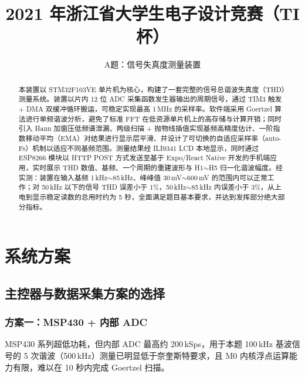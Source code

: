 \documentclass[a4paper]{article}
\title{\Huge2021 年浙江省大学生电子设计竞赛（TI 杯）}
\date{\LARGE A题：信号失真度测量装置}
\begin{document}
	\maketitle
	\vspace{10em}

	\begin{abstract}
		本装置以 STM32F103VE 单片机为核心，构建了一套完整的信号总谐波失真度（THD）测量系统。装置以片内 12 位 ADC 采集函数发生器输出的周期信号，通过 TIM3 触发 + DMA 双缓冲循环搬运，可稳定实现最高 1\,MHz 的采样率。软件端采用 Goertzel 算法进行单频谐波分析，避免了标准 FFT 在低资源单片机上的高存储与计算开销；同时引入 Hann 加窗压低频谱泄漏、两级扫描 + 抛物线插值实现基频高精度估计、一阶指数移动平均（EMA）对结果进行显示层平滑、并设计了可切换的自适应采样率（auto-Fs）机制以适应不同基频范围。测量结果经 ILI9341 LCD 本地显示，同时通过 ESP8266 模块以 HTTP POST 方式发送至基于 Expo/React Native 开发的手机端应用，实时展示 THD 数值、基频、一个周期的重建波形与 H1$\sim$H5 归一化谐波幅度。经实测：装置在输入基频 1\,kHz$\sim$85\,kHz、峰峰值 30\,mV$\sim$600\,mV 的范围内可以正常工作；对 50\,kHz 以下的信号 THD 误差小于 1\%，50\,kHz$\sim$85\,kHz 内误差小于 3\%，从上电到显示稳定读数的总用时约为 5 秒，全面满足题目基本要求，并达到发挥部分绝大部分指标。
\\
		\newline
	\end{abstract}

	\vspace{1cm}\vspace{1cm}\vspace{1cm}\vspace{1cm}

	\newpage
	\tableofcontents


	\newpage
	\section{系统方案}

	\subsection{主控器与数据采集方案的选择}

	\subsubsection{方案一：MSP430 + 内部 ADC}
	MSP430 系列超低功耗，但内部 ADC 最高约 200\,kSps，用于本题 100\,kHz 基波信号的 5 次谐波（500\,kHz）测量已明显低于奈奎斯特要求，且 M0 内核浮点运算能力有限，难以在 10 秒内完成 Goertzel 扫描。
\end{document}
